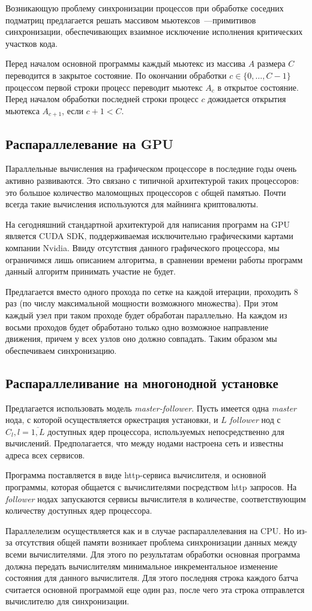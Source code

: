 Возникающую проблему синхронизации процессов при обработке соседних подматриц предлагается решать массивом мьютексов~---примитивов синхронизации, обеспечивающих взаимное исключение исполнения критических участков кода.

Перед началом основной программы каждый мьютекс из массива $A$ размера $C$ переводится в закрытое состояние. По окончании обработки $c \in \{0,\ldots,C-1\}$ процессом первой строки процесс переводит мьютекс $A_{c}$ в открытое состояние. Перед началом обработки последней строки процесс $c$ дожидается открытия мьютекса $A_{c+1}$, если $c+1<C$.

\subsection{Распараллелевание на GPU}
Параллельные вычисления на графическом процессоре в последние годы очень активно развиваются. Это связано с типичной архитектурой таких процессоров: это большое количество маломощных процессоров с общей памятью. Почти всегда такие вычисления используются для майнинга криптовалюты.

На сегодняшний стандартной архитектурой для написания программ на GPU является CUDA SDK, поддерживаемая исключительно графическими картами компании Nvidia. Ввиду отсутствия данного графического процессора, мы ограничимся лишь описанием алгоритма, в сравнении времени работы программ данный алгоритм принимать участие не будет.

Предлагается вместо одного прохода по сетке на каждой итерации, проходить 8 раз (по числу максимальной мощности возможного множества). При этом каждый узел при таком проходе будет обработан параллельно. На каждом из восьми проходов будет обработано только одно возможное направление движения, причем у всех узлов оно должно совпадать. Таким образом мы обеспечиваем синхронизацию.

\subsection{Распараллеливание на многонодной установке}
Предлагается использовать модель \textit{master-follower}. Пусть имеется одна \textit{master} нода, с которой осуществляется оркестрация установки, и $L$ \textit{follower} нод с $C_l, l=\overline{1,L}$ доступных ядер процессора, используемых непосредственно для вычислений. Предполагается, что между нодами настроена сеть и известны адреса всех сервисов.

Программа поставляется в виде http-сервиса вычислителя, и основной программы, которая общается с вычислителями посредством http запросов. На \textit{follower} нодах запускаются сервисы вычислителя в количестве, соответствующим количеству доступных ядер процессора.

Параллелелизм осуществляется как и в случае распараллелевания на CPU. Но из-за отсутствия общей памяти возникает проблема синхронизации данных между всеми вычислителями. Для этого по результатам обработки основная программа должна передать вычислителям минимальное инкрементальное изменение состояния для данного вычислителя. Для этого последняя строка каждого батча считается основной программой еще один раз, после чего эта строка отправлется вычислителю для синхронизации.